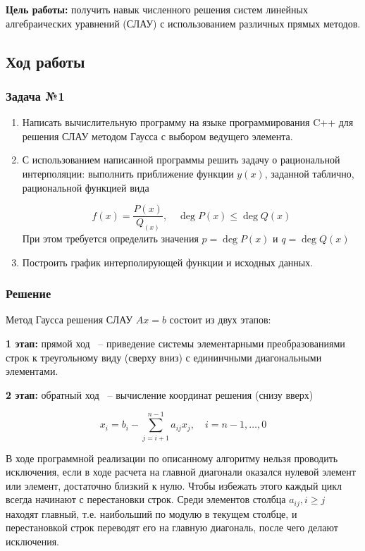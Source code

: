 \documentclass[a4paper, fontsize=14pt]{article}
\begin{document}

\textbf{Цель работы:} получить навык численного решения систем линейных алгебраических уравнений (СЛАУ) с использованием различных прямых методов.
\subsection*{{Ход работы}}
\subsubsection*{Задача №1}
\begin{enumerate}
    \item Написать вычислительную программу на языке программирования C++ для решения СЛАУ методом Гаусса с выбором ведущего элемента.
    \item С использованием написанной программы решить задачу о
    рациональной интерполяции: выполнить приближение функции $y(x)$,
    заданной таблично, рациональной функцией вида
    
    \begin{equation}
        \label{rational_interp}
        f(x) = \frac{P(x)}{Q_(x)}, \quad \operatorname{deg} P(x) \leq \operatorname{deg} Q(x) 
    \end{equation}
    При этом требуется определить значения $p = \operatorname{deg} P(x)$ и $q = \operatorname{deg} Q(x)$
    \item Построить график интерполирующей функции и исходных данных.
\end{enumerate}
\subsubsection*{Решение}
    Метод Гаусса решения СЛАУ $Ax = b$ состоит из двух этапов:

\textbf{1 этап: } прямой ход ~-- приведение системы элементарными преобразованиями строк к треугольному виду (сверху вниз) с едининчными диагональными элементами.

\textbf{2 этап: } обратный ход ~-- вычисление координат решения (снизу вверх)

\begin{equation*}
    x_i =b_i - \sum_{j = i+1}^{n-1} a_{ij} x_j, \quad i = n-1, \dots, 0
\end{equation*}

В ходе программной реализации по описанному алгоритму нельзя проводить исключения, если в ходе расчета на
главной диагонали оказался нулевой элемент или элемент, достаточно близкий к
нулю. Чтобы избежать этого каждый цикл всегда начинают с перестановки строк.
Среди элементов столбца $a_{ij}, i \geq j$ находят главный, т.е. наибольший по модулю
в текущем столбце, и перестановкой строк переводят его на главную диагональ,
после чего делают исключения.
\end{document}
